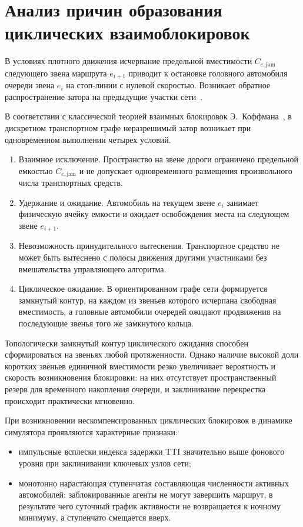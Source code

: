 \section{Анализ причин образования циклических взаимоблокировок}
\label{sec:deadlock_analysis}

В условиях плотного движения исчерпание предельной вместимости $C_{e,\text{jam}}$ следующего звена маршрута $e_{i+1}$ приводит к остановке головного автомобиля очереди звена $e_i$ на стоп-линии с нулевой скоростью. Возникает обратное распространение затора на предыдущие участки сети~\cite{daganzo1994ctm}.

В соответствии с классической теорией взаимных блокировок Э.~Коффмана~\cite{coffman1971deadlocks}, в дискретном транспортном графе неразрешимый затор возникает при одновременном выполнении четырех условий.
\begin{enumerate}
    \item Взаимное исключение. Пространство на звене дороги ограничено предельной емкостью $C_{e,\text{jam}}$ и не допускает одновременного размещения произвольного числа транспортных средств.
    \item Удержание и ожидание. Автомобиль на текущем звене $e_i$ занимает физическую ячейку емкости и ожидает освобождения места на следующем звене $e_{i+1}$.
    \item Невозможность принудительного вытеснения. Транспортное средство не может быть вытеснено с полосы движения другими участниками без вмешательства управляющего алгоритма.
    \item Циклическое ожидание. В ориентированном графе сети формируется замкнутый контур, на каждом из звеньев которого исчерпана свободная вместимость, а головные автомобили очередей ожидают продвижения на последующие звенья того же замкнутого кольца.
\end{enumerate}

Топологически замкнутый контур циклического ожидания способен сформироваться на звеньях любой протяженности. Однако наличие высокой доли коротких звеньев единичной вместимости резко увеличивает вероятность и скорость возникновения блокировки: на них отсутствует пространственный резерв для временного накопления очереди, и заклинивание перекрестка происходит практически мгновенно.

При возникновении нескомпенсированных циклических блокировок в динамике симулятора проявляются характерные признаки:
\begin{itemize}
    \item импульсные всплески индекса задержки TTI значительно выше фонового уровня при заклинивании ключевых узлов сети;
    \item монотонно нарастающая ступенчатая составляющая численности активных автомобилей: заблокированные агенты не могут завершить маршрут, в результате чего суточный график активности не возвращается к ночному минимуму, а ступенчато смещается вверх.
\end{itemize}

